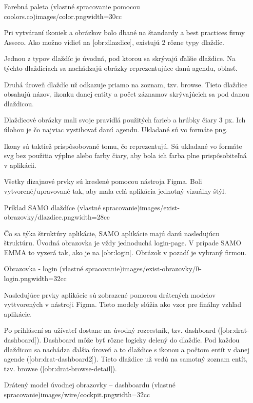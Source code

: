 {Farebná paleta (vlastné spracovanie pomocou coolors.co)}{images/color.png}{width=30cc} 

Pri vytváraní ikoniek a obrázkov bolo dbané na štandardy a best practices firmy Asseco. Ako možno vidieť na [obr:dlazdice], existujú 2 rôzne typy dlaždíc. 

Jednou z typov dlaždíc je úvodná, pod ktorou sa skrývajú ďalšie dlaždice. Na týchto dlaždiciach sa nachádzajú obrázky reprezentujúce danú agendu, oblasť. 

Druhá úroveň dlaždíc už odkazuje priamo na zoznam, tzv. browse. Tieto dlaždice obsahujú názov, ikonku danej entity a počet záznamov skrývajúcich sa pod danou dlaždicou. 

Dlaždicové obrázky mali svoje pravidlá použitých farieb a hrúbky čiary 3 px. Ich úlohou je čo najviac vystihovať danú agendu. Ukladané sú vo formáte png. 

Ikony sú taktiež prispôsobované tomu, čo reprezentujú. Sú ukladané vo formáte svg bez použitia výplne alebo farby čiary, aby bola ich farba plne prispôsobiteľná v aplikácii.

Všetky dizajnové prvky sú kreslené pomocou nástroja Figma. Boli vytvorené/upravované tak, aby mala celá aplikácia jednotný vizuálny štýl. 

{Príklad SAMO dlaždíce (vlastné spracovanie)}{images/exist-obrazovky/dlazdice.png}{width=28cc} 

Čo sa týka štruktúry aplikácie, SAMO aplikácie majú danú nasledujúcu štruktúru.  Úvodná obrazovka je vždy jednoduchá login-page. V prípade SAMO EMMA to vyzerá tak, ako je na [obr:login]. Obrázok v pozadí je vybraný firmou.

{Obrazovka - login (vlastné spracovanie)}{images/exist-obrazovky/0-login.png}{width=32cc} 

Nasledujúce prvky aplikácie sú zobrazené pomocou drátených modelov vyttvorených v nástroji Figma. Tieto modely slúžia ako vzor pre finálny vzhľad aplikácie.

Po prihlásení sa užívateľ dostane na úvodný rozcestník, tzv. dashboard ([obr:drat-dashboard]). Dashboard môže byť rôzne logicky delený do dlaždíc. Pod každou dlaždicou sa nachádza ďalšia úroveň a to dlaždice s ikonou a počtom entít v danej agende ([obr:drat-dashboard2]). Tieto dlaždice už vedú na samotný zoznam entít, tzv. browse ([obr:drat-browse-detail]).

{Drátený model úvodnej obrazovky -- dashboardu (vlastné spracovanie)}{images/wire/cockpit.png}{width=32cc}

